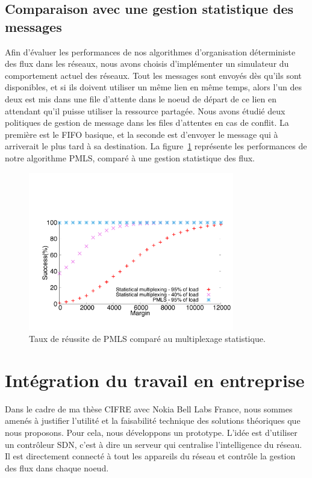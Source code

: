 \documentclass{article}
\begin{document}
\subsection{Comparaison avec une gestion statistique des messages}
Afin d'évaluer les performances de nos algorithmes d'organisation déterministe des flux dans les réseaux, nous avons choisis d'implémenter un simulateur du comportement actuel des réseaux. Tout les messages sont envoyés dès qu'ils sont disponibles, et si ils doivent utiliser un même lien en même temps, alors l'un des deux est mis dans une file d'attente dans le noeud de départ de ce lien en attendant qu'il puisse utiliser la ressource partagée. Nous avons étudié deux politiques de gestion de message dans les files d'attentes en cas de conflit. La première est le FIFO basique, et la seconde est d'envoyer le message qui à arriverait le plus tard à sa destination. 
La figure~\ref{fig:sto} représente les performances de notre algorithme PMLS, comparé à une gestion statistique des flux.
 \begin{figure}
       \begin{center}
      \includegraphics[width = 0.8\textwidth]{stochastic.pdf}
      \end{center}
      \caption{Taux de réussite de PMLS comparé au multiplexage statistique.}
      \label{fig:sto}   
     \end{figure}    
\section{Intégration du travail en entreprise}
Dans le cadre de ma thèse CIFRE avec Nokia Bell Labs France, nous sommes amenés à justifier l'utilité et la faisabilité technique des solutions théoriques que nous proposons.
Pour cela, nous développons un prototype. L'idée est d'utiliser un contrôleur SDN, c'est à dire un serveur qui centralise l'intelligence du réseau. Il est directement connecté à tout les appareils du réseau et contrôle la gestion des flux dans chaque noeud. 
\end{document}

